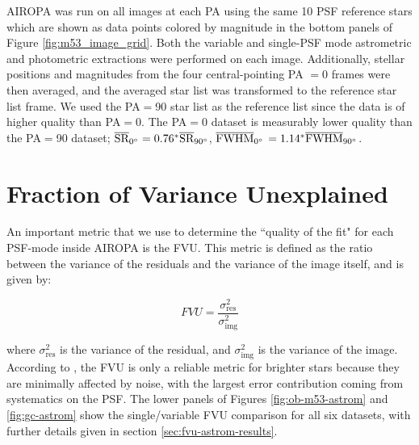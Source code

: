 \documentclass[]{spie}  %
\begin{document}
AIROPA was run on all images at each PA using the same 10 PSF reference stars which are shown as data points colored by magnitude in the bottom panels of Figure \ref{fig:m53_image_grid}. Both the variable and single-PSF mode astrometric and photometric extractions were performed on each image. Additionally, stellar positions and magnitudes from the four central-pointing PA $=0$ frames were then averaged, and the averaged star list was transformed to the reference star list frame. We used the PA$=$90 star list as the reference list since the data is of higher quality than PA$=$0. The PA$=$0 dataset is measurably lower quality than the PA$=$90 dataset; $\overline{\textrm{SR}}_{0\degree} = 0.76^{*}\overline{\textrm{SR}}_{90\degree}$, $\overline{\textrm{FWHM}}_{0\degree}$ $= 1.14^{*}\overline{\textrm{FWHM}}_{90\degree}$.


\section{Fraction of Variance Unexplained} \label{sec:fvu}
An important metric that we use to determine the ``quality of the fit" for each PSF-mode inside AIROPA is the FVU. This metric is defined as the ratio between the variance of the residuals and the variance of the image itself, and is given by:

\begin{equation}
    FVU = \frac{\sigma^{2}_{\textrm{res}}}{\sigma^{2}_{\textrm{img}}}
\end{equation}

\noindent where $\sigma^{2}_{\textrm{res}}$ is the variance of the residual, and $\sigma^{2}_{\textrm{img}}$ is the variance of the image. According to \cite{Turri:inprep}, the FVU is only a reliable metric for brighter stars because they are minimally affected by noise, with the largest error contribution coming from systematics on the PSF. The lower panels of Figures \ref{fig:ob-m53-astrom} and \ref{fig:gc-astrom} show the single/variable FVU comparison for all six datasets, with further details given in section \ref{sec:fvu-astrom-results}. %
\end{document}
